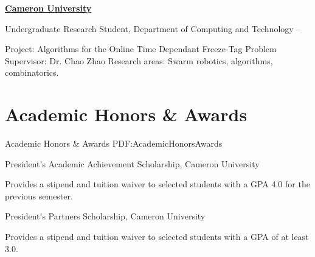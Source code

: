 \documentclass[letterpaper,10pt,oneside]{article}
\begin{document}
\begin{body}
\href{http://www.example.com/my-institute}
{\textbf{Cameron University}}
\par
Undergraduate Research Student, Department of Computing and Technology
\hfill
{} --
\begin{detail}
\BulletItem
Project:
Algorithms for the Online Time Dependant Freeze-Tag Problem
\BulletItem
Supervisor:
Dr. Chao Zhao
\BulletItem
Research areas:
Swarm robotics, algorithms, combinatorics.
\end{detail}







\section
{Academic Honors\newline
\& Awards}
{Academic Honors \& Awards}
{PDF:AcademicHonorsAwards}

President's Academic Achievement Scholarship, Cameron University
\hfill
{}
\begin{detail}
	Provides a stipend and tuition waiver to selected students with a GPA 4.0 for the previous semester. 
\end{detail}

\EntryGap

President's Partners Scholarship, Cameron University
\hfill
{} 
\begin{detail}
	Provides a stipend and tuition waiver to selected students with a GPA of at least 3.0. 
\end{detail}


\end{body}
\end{document}
